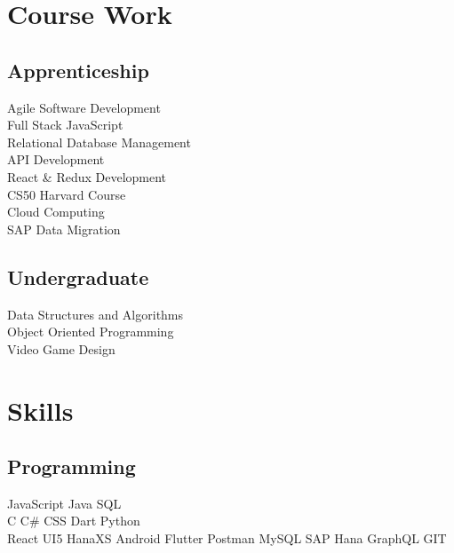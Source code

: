 \documentclass[]{deedy-resume-openfont}
\begin{document}
\begin{minipage}[t]{0.33\textwidth}
\section{Course Work}

\subsection{Apprenticeship}
Agile Software Development  \\
Full Stack JavaScript \\
Relational Database Management \\
API Development \\
React & Redux Development \\
CS50 Harvard Course \\
Cloud Computing \\
SAP Data Migration \\
\vspace{\topsep} %
\subsection{Undergraduate}
Data Structures and Algorithms \\
Object Oriented Programming  \\
Video Game Design \\



\section{Skills}
\subsection{Programming}
JavaScript \textbullet{}   Java \textbullet{} SQL\\
C \textbullet{} C\# \textbullet{} CSS \textbullet{} Dart \textbullet{} Python \\
React \textbullet{} UI5 \textbullet{} HanaXS \textbullet{} Android \textbullet{} Flutter \textbullet{} Postman \textbullet{} MySQL \textbullet{} SAP Hana \textbullet{} GraphQL \textbullet{} GIT
\sectionsep

%
%

\end{minipage} 
\end{document}
